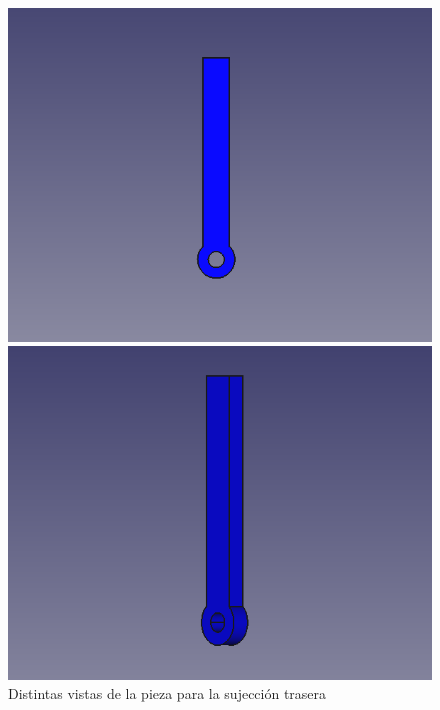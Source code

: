 \begin{figure}[ht!]
	\centering
	\begin{minipage}{0.45\linewidth}
		\centering
		\includegraphics[width=\linewidth]{figs/cap5/trasera1.png}
		\caption*{\centering}
	\end{minipage}
	\hspace{1cm}
	\begin{minipage}{0.45\linewidth}
		\centering
		\includegraphics[width=\linewidth]{figs/cap5/trasera2.png}
		\caption*{\centering}
	\end{minipage}
	\caption{Distintas vistas de la pieza para la sujección trasera}
	\label{fig:ptrasera}
\end{figure}

